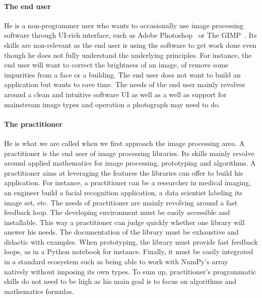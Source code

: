 \paragraph{The end user} He is a non-programmer user who wants to occasionally use image processing software through
UI-rich interface, such as Adobe Photoshop~\parencite{adobe.2019.photoshop} or The GIMP~\parencite{gimp.2019}. Its
skills are non-relevant as the end user is using the software to get work done even though he does not fully understand
the underlying principles. For instance, the end user will want to correct the brightness of an image, of remove some
impurities from a face or a building. The end user does not want to build an application but wants to save time. The
needs of the end user mainly revolves around a clean and intuitive software UI as well as a well as support for
mainstream image types and operation a photograph may need to do.

\paragraph{The practitioner} He is what we are called when we first approach the image processing area. A practitioner
is the end user of image processing libraries. Its skills mainly revolve around applied mathematics for image
processing, prototyping and algorithms. A practitioner aims at leveraging the features the libraries can offer to build
his application. For instance, a practitioner can be a researcher in medical imaging, an engineer build a facial
recognition application, a data scientist labeling its image set, etc. The needs of practitioner are mainly revolving
around a fast feedback loop. The developing environment must be easily accessible and installable. This way a
practitioner can judge quickly whether one library will answer his needs. The documentation of the library must be
exhaustive and didactic with examples. When prototyping, the library must provide fast feedback loops, as in a Python
notebook for instance. Finally, it must be easily integrated in a standard ecosystem such as being able to work with
NumPy's array~\parencite{oram.2007.numpy,oliphant.2006.numpy,harris.2020.numpy} natively without imposing its own types.
To sum up, practitioner's programmatic skills do not need to be high as his main goal is to focus on algorithms and
mathematics formulas.

